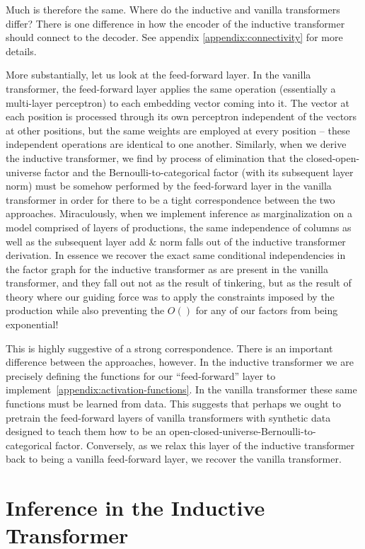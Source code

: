 \documentclass{article}
\begin{document}
Much is therefore the same.  Where do the inductive and vanilla transformers differ?  There is one difference in how the encoder of the inductive transformer should connect to the decoder. See appendix \ref{appendix:connectivity} for more details.

More substantially, let us look at the feed-forward layer.  In the vanilla transformer, the feed-forward layer applies the same operation (essentially a multi-layer perceptron) to each embedding vector coming into it.  The vector at each position is processed through its own perceptron independent of the vectors at other positions, but the same weights are employed at every position -- these independent operations are identical to one another.  Similarly, when we derive the inductive transformer, we find by process of elimination that the closed-open-universe factor and the Bernoulli-to-categorical factor (with its subsequent layer norm) must be somehow performed by the feed-forward layer in the vanilla transformer in order for there to be a tight correspondence between the two approaches.  Miraculously, when we implement inference as marginalization on a model comprised of layers of productions, the same independence of columns as well as the subsequent layer add \& norm falls out of the inductive transformer derivation.  In essence we recover the exact same conditional independencies in the factor graph for the inductive transformer as are present in the vanilla transformer, and they fall out not as the result of tinkering, but as the result of theory where our guiding force was to apply the constraints imposed by the production while also preventing the $O()$ for any of our factors from being exponential!

This is highly suggestive of a strong correspondence.  There is an important difference between the approaches, however.  In the inductive transformer we are precisely defining the functions for our ``feed-forward'' layer to implement~\ref{appendix:activation-functions}.  In the vanilla transformer these same functions must be learned from data.  This suggests that perhaps we ought to pretrain the feed-forward layers of vanilla transformers with synthetic data designed to teach them how to be an open-closed-universe-Bernoulli-to-categorical factor. Conversely, as we relax this layer of the inductive transformer back to being a vanilla feed-forward layer, we recover the vanilla transformer.


\section{Inference in the Inductive Transformer}
\end{document}
